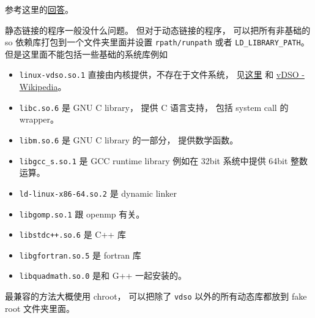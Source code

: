 
\begin{issues}
\issueDraft
\end{issues}


参考这里的\href{https://stackoverflow.com/questions/20183883/determining-binary-compatibility-under-linux}{回答}。

静态链接的程序一般没什么问题。 但对于动态链接的程序， 可以把所有非基础的 so 依赖库打包到一个文件夹里面并设置 \verb|rpath/runpath| 或者 \verb|LD_LIBRARY_PATH|。 但是这里面不能包括一些基础的系统库例如
\begin{itemize}
\item \verb`linux-vdso.so.1` 直接由内核提供，不存在于文件系统， 见\href{https://unix.stackexchange.com/questions/476971/ldd-shows-no-location-after-arrow-library-does-not-exist-on-system}{这里} 和 \href{https://en.wikipedia.org/wiki/VDSO}{vDSO - Wikipedia}。
\item \verb`libc.so.6` 是 GNU C library， 提供 C 语言支持， 包括 system call 的 wrapper。
\item \verb`libm.so.6` 是 GNU C library 的一部分， 提供数学函数。
\item \verb`libgcc_s.so.1` 是 GCC runtime library 例如在 32bit 系统中提供 64bit 整数运算。
\item \verb`ld-linux-x86-64.so.2` 是 dynamic linker
\item \verb`libgomp.so.1` 跟 openmp 有关。
\item \verb`libstdc++.so.6` 是 C++ 库
\item \verb`libgfortran.so.5` 是 fortran 库
\item \verb`libquadmath.so.0` 是和 G++ 一起安装的。
\end{itemize}

最兼容的方法大概使用 chroot， 可以把除了 \verb|vdso| 以外的所有动态库都放到 fake root 文件夹里面。
